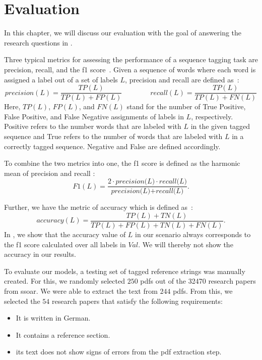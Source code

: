\chapter{Evaluation}\label{cha:evaluation}

In this chapter, we will discuss our evaluation with the goal of answering the research questions in .

Three typical metrics for assessing the performance of a sequence tagging task are \gls{precision}, \gls{recall}, and the \gls{f1 score}~\citep{councill2008parscit}.
Given a sequence of words where each word is assigned a label out of a set of labels $L$, \gls{precision} and \gls{recall} are defined as~\citep{goutte2005probabilistic}:
\begin{equation*}
  \textit{precision}(L)=\frac{TP(L)}{TP(L)+FP(L)}\hspace{4em}\textit{recall}(L)=\frac{TP(L)}{TP(L)+FN(L)}
\end{equation*}
Here, $TP(L)$, $FP(L)$, and $FN(L)$ stand for the number of True Positive, False Positive, and False Negative assignments of labels in $L$, respectively.
Positive refers to the number words that are labeled with $L$ in the given tagged sequence and True refers to the number of words that are labeled with $L$ in a correctly tagged sequence.
Negative and False are defined accordingly.

To combine the two metrics into one, the \gls{f1 score} is defined as the harmonic mean of \gls{precision} and \gls{recall} \citep{bilenko2003adaptive}:
\begin{equation*}
  \textit{F1}(L)=\frac{2\cdot\textit{precision(L)}\cdot\textit{recall(L)}}{\textit{precision(L)}+\textit{recall(L)}}.
\end{equation*}

Further, we have the metric of \gls{accuracy} which is defined as~\citep{powers2011evaluation}:
\begin{equation*}
  \textit{accuracy}(L)=\frac{TP(L)+TN(L)}{TP(L)+FP(L)+TN(L)+FN(L)}.
\end{equation*}
In , we show that the accuracy value of $L$ in our scenario always corresponds to the \gls{f1 score} calculated over all labels in $\textit{Val}$.
We will thereby not show the accuracy in our results.

\bigskip

To evaluate our models, a testing set of tagged reference strings was manually created.
For this, we randomly selected $250$ \glspl{pdf} out of the \num{32470} research papers from \gls{ssoar}.
We were able to extract the text from $244$ \glspl{pdf}.
From this, we selected the $54$ research papers that satisfy the following requirements:
\begin{itemize}
  \item It is written in German.
  \item It contains a reference section.
  \item its text does not show signs of errors from the \gls{pdf} extraction step.
\end{itemize}

